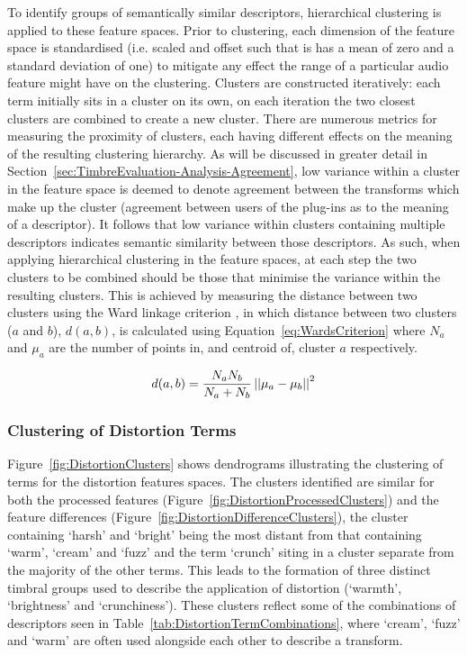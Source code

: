 		To identify groups of semantically similar descriptors, hierarchical clustering is applied to these feature
		spaces. Prior to clustering, each dimension of the feature space is standardised (i.e. scaled and offset
		such that is has a mean of zero and a standard deviation of one) to mitigate any effect the range of a
		particular audio feature might have on the clustering. Clusters are constructed iteratively: each term
		initially sits in a cluster on its own, on each iteration the two closest clusters are combined to create a
		new cluster. There are numerous metrics for measuring the proximity of clusters, each having different
		effects on the meaning of the resulting clustering hierarchy. As will be discussed in greater detail in
		Section~\ref{sec:TimbreEvaluation-Analysis-Agreement}, low variance within a cluster in the feature space
		is deemed to denote agreement between the transforms which make up the cluster (agreement between users of
		the plug-ins as to the meaning of a descriptor). It follows that low variance within clusters containing
		multiple descriptors indicates semantic similarity between those descriptors. As such, when applying
		hierarchical clustering in the feature spaces, at each step the two clusters to be combined should be those
		that minimise the variance within the resulting clusters. This is achieved by measuring the distance
		between two clusters using the Ward linkage criterion \citep{ward1963hierarchical}, in which distance
		between two clusters ($a$ and $b$), $d(a, b)$, is calculated using Equation~\ref{eq:WardsCriterion} where
		$N_{a}$ and $\mu_{a}$ are the number of points in, and centroid of, cluster $a$ respectively.

		\begin{equation}
			d(a, b) = \frac{N_{a}N_{b}}{N_{a} + N_{b}} \left|\left|\mu_{a} - \mu_{b}\right|\right|^{2}
			\label{eq:WardsCriterion}
		\end{equation}


		\subsubsection*{Clustering of Distortion Terms}
			Figure~\ref{fig:DistortionClusters} shows dendrograms illustrating the clustering of terms for the
			distortion features spaces. The clusters identified are similar for both the processed features
			(Figure~\ref{fig:DistortionProcessedClusters}) and the feature differences
			(Figure~\ref{fig:DistortionDifferenceClusters}), the cluster containing `harsh' and `bright' being
			the most distant from that containing `warm', `cream' and `fuzz' and the term `crunch' siting in a
			cluster separate from the majority of the other terms. This leads to the formation of three
			distinct timbral groups used to describe the application of distortion (`warmth', `brightness' and
			`crunchiness'). These clusters reflect some of the combinations of descriptors seen in
			Table~\ref{tab:DistortionTermCombinations}, where `cream', `fuzz' and `warm' are often used
			alongside each other to describe a transform.

